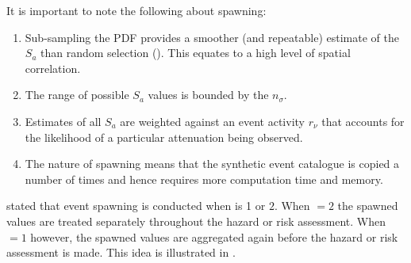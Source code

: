 It is important to note the following about spawning:
\begin{enumerate}
\item Sub-sampling the PDF provides a smoother (and repeatable)
estimate of the $S_a$ than random selection
(). This equates to a high level of
spatial correlation. \item The range of possible $S_a$ values is
bounded by the $n_\sigma$. \item Estimates of all $S_a$ are weighted
against an event activity $r_\nu$ that accounts for the likelihood
of a particular attenuation being observed. \item The nature of
spawning means that the synthetic event catalogue is copied a number
of times and hence requires more computation time and memory.
\end{enumerate}

 stated that event spawning is conducted when
 is 1 or $2$. When
$=2$ the spawned values are treated
separately throughout the hazard or risk assessment. When
$=1$ however, the spawned values are
aggregated again before the hazard or risk assessment is made. This
idea is illustrated in .

